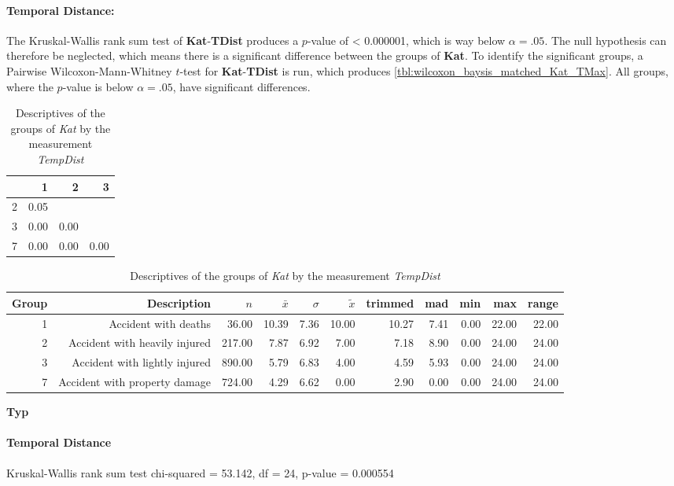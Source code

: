 \begin{table}[ht]
\paragraph{Temporal Distance:}
The Kruskal-Wallis rank sum test of \textbf{Kat}-\textbf{TDist} produces a $p$-value of < 0.000001, which is way below $\alpha=.05$. The null hypothesis can therefore be neglected, which means there is a significant difference between the groups of \textbf{Kat}. To identify the significant groups, a Pairwise Wilcoxon-Mann-Whitney $t$-test for \textbf{Kat}-\textbf{TDist} is run, which produces \autoref{tbl:wilcoxon_baysis_matched_Kat_TMax}. All groups, where the $p$-value is below $\alpha=.05$, have significant differences. 
\begin{tabular}{rrrr}
  	\toprule
 	& 1 & 2 & 3 \\ 
  	\midrule
	2 & 0.05 &  &  \\ 
  	3 & 0.00 & 0.00 &  \\ 
  	7 & 0.00 & 0.00 & 0.00 \\ 
   	\bottomrule
\end{tabular}
\begin{table}[ht]
	\small
	\centering
	\begin{tabular}{rrrrrrrrrrr}
	  	\toprule
		Group & Description & $n$ & $\bar{x}$ & $\sigma$ & $\tilde{x}$ & trimmed & mad & min & max & range \\ 
	  	\midrule
		1 & Accident with deaths & 36.00 & 10.39 & 7.36 & 10.00 & 10.27 & 7.41 & 0.00 & 22.00 & 22.00 \\ 
	  	2 & Accident with heavily injured & 217.00 & 7.87 & 6.92 & 7.00 & 7.18 & 8.90 & 0.00 & 24.00 & 24.00 \\ 
	  	3 & Accident with lightly injured & 890.00 & 5.79 & 6.83 & 4.00 & 4.59 & 5.93 & 0.00 & 24.00 & 24.00 \\ 
	  	7 & Accident with property damage & 724.00 & 4.29 & 6.62 & 0.00 & 2.90 & 0.00 & 0.00 & 24.00 & 24.00 \\ 
	   	\bottomrule
	\end{tabular}
	\caption{Descriptives of the groups of \textit{Kat} by the measurement \textit{TempDist}}
\end{table}

\large
\centerline{\textbf{Typ}}
\normalsize

\paragraph{Temporal Distance}
Kruskal-Wallis rank sum test chi-squared = 53.142, df = 24, p-value = 0.000554


\end{table}
